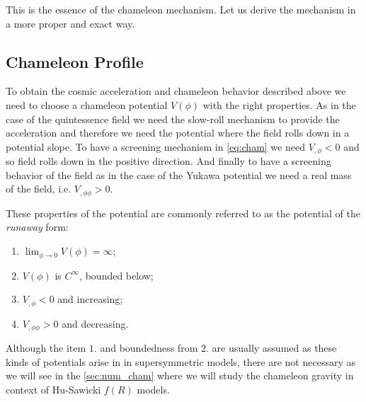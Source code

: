 This is the essence of the chameleon mechanism. Let us derive the mechanism in a more proper and exact way.
\subsection{Chameleon Profile}
\label{cham_prof}
To obtain the cosmic acceleration and chameleon behavior described above we need to choose a chameleon potential $V(\phi)$ with the right properties. As in the case of the quintessence field we need the slow-roll mechanism to provide the acceleration and therefore we need the potential where the field rolls down in a potential slope. To have a screening mechanism in \eqref{eq:cham} we need $V_{,\phi}<0$ and so field rolls down in the positive direction. And finally to have a screening behavior of the field as in  the case of the Yukawa potential we need a real mass of the field, i.e. $V_{,\phi\phi}>0$.

These properties of the potential are commonly referred to as the potential of the \textit{runaway} form:
\begin{enumerate}
	\item $\lim_{\phi \to 0}V\left(\phi\right)=\infty$;
	\item $V\left(\phi\right)$ is $C^\infty$, bounded below;
	\item $V_{,\phi}<0$ and increasing;
	\item $V_{,\phi\phi}>0$ and decreasing.
\end{enumerate}
Although the item $1.$ and boundedness from $2.$ are usually assumed as these kinds of potentials arise in in supersymmetric models, there are not necessary as we will see in the \autoref{sec:num_cham} where we will study the chameleon gravity in context of Hu-Sawicki $f(R)$ models.

